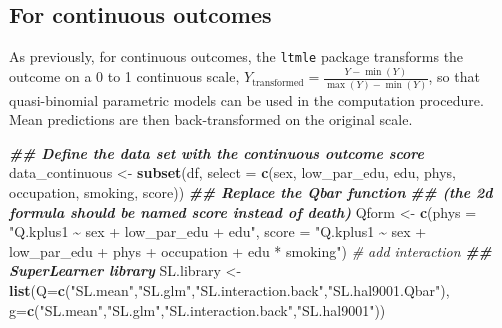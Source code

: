 \documentclass[
]{book}
\newenvironment{Shaded}{\begin{snugshade}}{\end{snugshade}}
\newcommand{\AttributeTok}[1]{\textcolor[rgb]{0.13,0.29,0.53}{#1}}
\newcommand{\CommentTok}[1]{\textcolor[rgb]{0.56,0.35,0.01}{\textit{#1}}}
\newcommand{\DocumentationTok}[1]{\textcolor[rgb]{0.56,0.35,0.01}{\textbf{\textit{#1}}}}
\newcommand{\FunctionTok}[1]{\textcolor[rgb]{0.13,0.29,0.53}{\textbf{#1}}}
\newcommand{\NormalTok}[1]{#1}
\newcommand{\OtherTok}[1]{\textcolor[rgb]{0.56,0.35,0.01}{#1}}
\newcommand{\StringTok}[1]{\textcolor[rgb]{0.31,0.60,0.02}{#1}}
\begin{document}
\subsection{For continuous outcomes}\label{for-continuous-outcomes}

As previously, for continuous outcomes, the \texttt{ltmle} package transforms the outcome on a 0 to 1 continuous scale, \(Y_\text{transformed} = \frac{Y - \min(Y)}{\max(Y) - \min(Y)}\), so that quasi-binomial parametric models can be used in the computation procedure. Mean predictions are then back-transformed on the original scale.

\begin{Shaded}
\begin{Highlighting}[]
\DocumentationTok{\#\# Define the data set with the continuous outcome score}
\NormalTok{data\_continuous }\OtherTok{\textless{}{-}} \FunctionTok{subset}\NormalTok{(df, }\AttributeTok{select =} \FunctionTok{c}\NormalTok{(sex, low\_par\_edu,}
\NormalTok{                                         edu, phys, occupation,}
\NormalTok{                                         smoking, score))}
\DocumentationTok{\#\# Replace the Qbar function }
\DocumentationTok{\#\# (the 2d formula should be named score instead of death)}
\NormalTok{Qform }\OtherTok{\textless{}{-}} \FunctionTok{c}\NormalTok{(}\AttributeTok{phys =} \StringTok{"Q.kplus1 \textasciitilde{} sex + low\_par\_edu + edu"}\NormalTok{,}
           \AttributeTok{score =} \StringTok{"Q.kplus1 \textasciitilde{} sex + low\_par\_edu + phys + occupation +}
\StringTok{                               edu * smoking"}\NormalTok{) }\CommentTok{\# add interaction}
\DocumentationTok{\#\# SuperLearner library}
\NormalTok{SL.library }\OtherTok{\textless{}{-}} \FunctionTok{list}\NormalTok{(}\AttributeTok{Q=}\FunctionTok{c}\NormalTok{(}\StringTok{"SL.mean"}\NormalTok{,}\StringTok{"SL.glm"}\NormalTok{,}\StringTok{"SL.interaction.back"}\NormalTok{,}\StringTok{"SL.hal9001.Qbar"}\NormalTok{),}
                   \AttributeTok{g=}\FunctionTok{c}\NormalTok{(}\StringTok{"SL.mean"}\NormalTok{,}\StringTok{"SL.glm"}\NormalTok{,}\StringTok{"SL.interaction.back"}\NormalTok{,}\StringTok{"SL.hal9001"}\NormalTok{))}


\end{Highlighting}
\end{Shaded}
\end{document}
